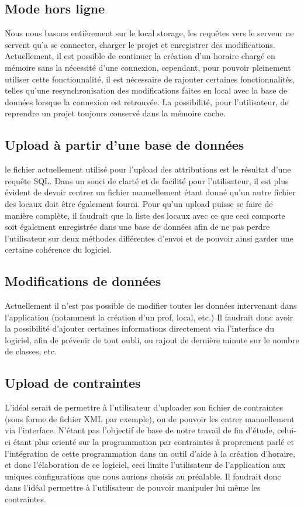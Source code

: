 \subsection{Mode hors ligne}
Nous nous basons entièrement sur le local storage, les requêtes vers le serveur ne 
servent qu'a se connecter, charger le projet et enregistrer des modifications.
Actuellement, il est possible de continuer la création d'un horaire chargé en 
mémoire sans la nécessité d'une connexion, cependant, pour pouvoir pleinement 
utiliser cette fonctionnalité, il est nécessaire de rajouter certaines fonctionnalités, telles 
qu'une resynchronisation des modifications faites en local avec la base de données lorsque la 
connexion est retrouvée. La possibilité, pour l'utilisateur, de reprendre un projet toujours conservé dans la mémoire cache.

\subsection{Upload à partir d'une base de données}
le fichier actuellement utilisé pour l'upload des attributions est le résultat d'une requête SQL. Dans un souci de clarté et de facilité pour l'utilisateur, il est plus évident de devoir rentrer un fichier manuellement étant donné qu'un autre fichier des locaux doit être également fourni. Pour qu'un upload puisse se faire de manière complète, il faudrait que la liste des locaux avec ce que ceci comporte soit également enregistrée dans une base de données afin de ne pas perdre l'utilisateur sur deux méthodes différentes d'envoi et de pouvoir ainsi garder une certaine cohérence du logiciel.

\subsection{Modifications de données}
Actuellement il n'est pas possible de modifier toutes les données intervenant 
dans l'application (notamment la création d'un prof, local, etc.) Il faudrait donc avoir la possibilité d'ajouter certaines informations directement via l'interface du logiciel, afin de prévenir de tout oubli, ou rajout de dernière minute sur le nombre de classes, etc.

\subsection{Upload de contraintes}
L'idéal serait de permettre à l'utilisateur d'uploader son fichier de contraintes (sous forme de fichier XML par exemple), ou de pouvoir les entrer manuellement via l'interface. N'étant pas l'objectif de base de notre travail de fin d'étude, celui-ci étant plus orienté sur la programmation par contraintes à proprement parlé et l'intégration de cette programmation dans un outil d'aide à la création d'horaire, et donc l'élaboration de ce logiciel, ceci limite l'utilisateur de l'application aux uniques configurations que nous aurions choisis au préalable. Il faudrait donc dans l'idéal permettre à l'utilisateur de pouvoir manipuler lui même les contraintes.
